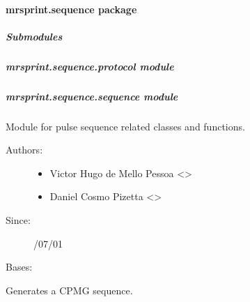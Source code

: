 \documentclass[a4paper,10pt,english]{sphinxmanual}
\begin{document}
\paragraph{mrsprint.sequence package}
\label{\detokenize{autodoc/mrsprint/mrsprint.sequence:mrsprint-sequence-package}}\label{\detokenize{autodoc/mrsprint/mrsprint.sequence::doc}}

\subparagraph{Submodules}
\label{\detokenize{autodoc/mrsprint/mrsprint.sequence:submodules}}

\subparagraph{mrsprint.sequence.protocol module}
\label{\detokenize{autodoc/mrsprint/mrsprint.sequence:mrsprint-sequence-protocol-module}}

\subparagraph{mrsprint.sequence.sequence module}
\label{\detokenize{autodoc/mrsprint/mrsprint.sequence:module-mrsprint.sequence.sequence}}\label{\detokenize{autodoc/mrsprint/mrsprint.sequence:mrsprint-sequence-sequence-module}}
Module for pulse sequence related classes and functions.
\begin{description}
\item[{Authors:}] \leavevmode\begin{itemize}
\item {} 
Victor Hugo de Mello Pessoa \textless{}\textgreater{}

\item {} 
Daniel Cosmo Pizetta \textless{}\textgreater{}

\end{itemize}

\item[{Since:}] /07/01

\end{description}

\begin{fulllineitems}
\label{\detokenize{autodoc/mrsprint/mrsprint.sequence:mrsprint.sequence.sequence.CPMGSequence}}
Bases: {\hyperref[\detokenize{autodoc/mrsprint/mrsprint.sequence:mrsprint.sequence.sequence.Sequence}]{}}

Generates a CPMG sequence.

\end{fulllineitems}
\end{document}
